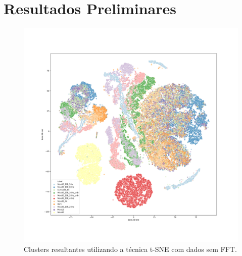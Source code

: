 
\chapter{Resultados Preliminares}

\begin{figure}[H]
    \caption{Clusters resultantes utilizando a técnica t-SNE com dados sem FFT.}
    \begin{center}
        \includegraphics[scale=.25]{resultados/img/t-sne-1.png}
    \end{center}
    \label{fig:}
\end{figure}


